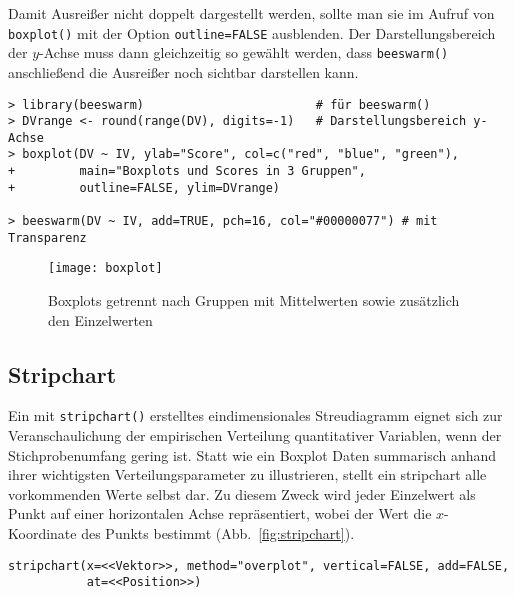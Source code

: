 Damit Ausreißer nicht doppelt dargestellt werden, sollte man sie im Aufruf von \lstinline!boxplot()! mit der Option \lstinline!outline=FALSE! ausblenden. Der Darstellungsbereich der $y$-Achse muss dann gleichzeitig so gewählt werden, dass \lstinline!beeswarm()! anschließend die Ausreißer noch sichtbar darstellen kann.
\begin{lstlisting}
> library(beeswarm)                        # für beeswarm()
> DVrange <- round(range(DV), digits=-1)   # Darstellungsbereich y-Achse
> boxplot(DV ~ IV, ylab="Score", col=c("red", "blue", "green"),
+         main="Boxplots und Scores in 3 Gruppen",
+         outline=FALSE, ylim=DVrange)
 
> beeswarm(DV ~ IV, add=TRUE, pch=16, col="#00000077") # mit Transparenz
\end{lstlisting}

\begin{figure}[ht]
\centering
\texttt{[image: boxplot]}
\vspace*{-1em}
\caption{Boxplots getrennt nach Gruppen mit Mittelwerten sowie zusätzlich den Einzelwerten}
\label{fig:boxplot}
\end{figure}

\subsection{Stripchart}

Ein mit \lstinline!stripchart()! erstelltes eindimensionales Streudiagramm eignet sich zur Veranschaulichung der empirischen Verteilung quantitativer Variablen, wenn der Stichprobenumfang gering ist. Statt wie ein Boxplot Daten summarisch anhand ihrer wichtigsten Verteilungsparameter zu illustrieren, stellt ein stripchart alle vorkommenden Werte selbst dar. Zu diesem Zweck wird jeder Einzelwert als Punkt auf einer horizontalen Achse repräsentiert, wobei der Wert die $x$-Koordinate des Punkts bestimmt (Abb.\ \ref{fig:stripchart}).
\begin{lstlisting}
stripchart(x=<<Vektor>>, method="overplot", vertical=FALSE, add=FALSE,
           at=<<Position>>)
\end{lstlisting}

